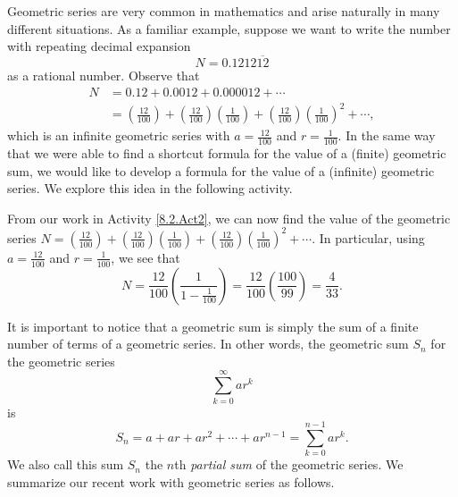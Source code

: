 Geometric series are very common in mathematics and arise naturally in many different situations. As a familiar example, suppose we want to write the number with repeating decimal expansion
\[N=0.1212\overline{12}\]
as a rational number.
Observe that
\begin{align*}
N &=  0.12 + 0.0012 + 0.000012 + \cdots \\
    &= \left(\frac{12}{100}\right) + \left(\frac{12}{100}\right)\left(\frac{1}{100}\right) + \left(\frac{12}{100}\right)\left(\frac{1}{100}\right)^2 + \cdots,
\end{align*}
which is an infinite geometric series with $a=\frac{12}{100}$ and $r = \frac{1}{100}$.   In the same way that we were able to find a shortcut formula for the value of a (finite) geometric sum, we would like to develop a formula for the value of a (infinite) geometric series.  We explore this idea in the following activity.



From our work in Activity \ref{8.2.Act2}, we can now find the value of the geometric series $N = \left(\frac{12}{100}\right) + \left(\frac{12}{100}\right)\left(\frac{1}{100}\right) + \left(\frac{12}{100}\right)\left(\frac{1}{100}\right)^2 + \cdots.$  In particular, using $a = \frac{12}{100}$ and $r = \frac{1}{100}$, we see that
\[N = \frac{12}{100} \left(\frac{1}{1-\frac{1}{100}}\right) = \frac{12}{100} \left(\frac{100}{99}\right) = \frac{4}{33}.\]

It is important to notice that a geometric sum is simply the sum of a finite number of terms of a geometric series. In other words, the geometric sum $S_n$ for the geometric series
\[\sum_{k=0}^{\infty} ar^k\]
is
\[S_n = a+ar+ar^2 + \cdots + ar^{n-1} = \sum_{k=0}^{n-1} ar^k.\]
We also call this sum $S_n$ the $n$th \emph{partial sum} of the geometric series. We summarize our recent work with geometric series as follows.

\vspace*{5pt}
\nin {}
\vspace*{1pt}

